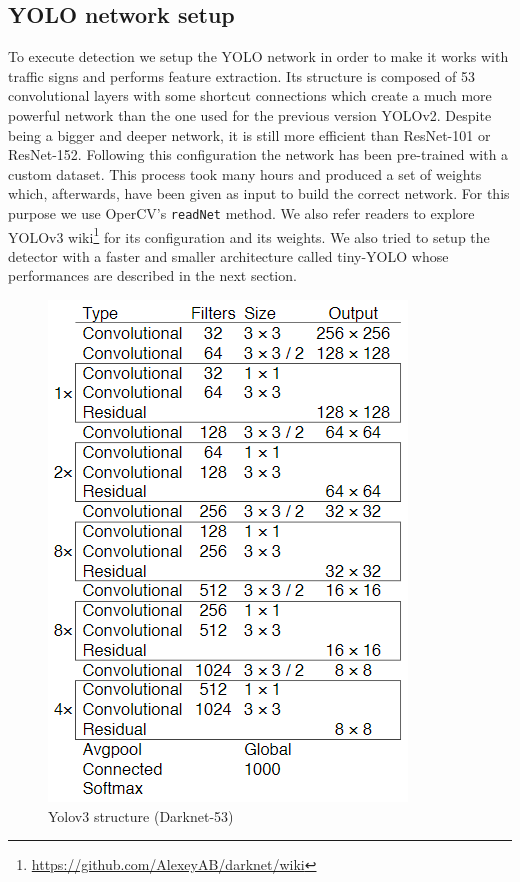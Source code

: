 \documentclass[10pt,twocolumn,letterpaper]{article}
\begin{document}
\subsection{YOLO network setup}
To execute detection we setup the YOLO network in order to make it works with traffic signs and performs feature extraction. Its structure is composed of 53 convolutional layers with some shortcut connections which create a much more powerful network than the one used for the previous version YOLOv2. Despite being a bigger and deeper network, it is still more efficient than ResNet-101 or ResNet-152. Following this configuration the network has been pre-trained with a custom dataset. This process took many hours and produced a set of weights which, afterwards, have been given as input to build the correct network. For this purpose we use OperCV's \texttt{readNet} method. We also refer readers to explore YOLOv3 wiki\footnote{\url{https://github.com/AlexeyAB/darknet/wiki}} for its configuration and its weights. We also tried to setup the detector with a faster and smaller architecture called tiny-YOLO \cite{tinyYolo} whose performances are described in the next section.
\begin{figure}[h]
	\centering\includegraphics[scale=0.7]{Res/Immagini/darknet53.PNG}	
	\caption{Yolov3 structure (Darknet-53)}
\end{figure}
\end{document}
